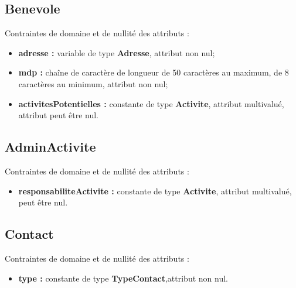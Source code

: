 \documentclass[asi, sansVersion]{picInsa}
\begin{document}
\subsection*{Benevole}
Contraintes de domaine et de nullité des attributs :
\begin{itemize}
 	\item \textbf{adresse :} variable de type \textbf{Adresse}, attribut non nul;
	\item \textbf{mdp :} chaîne de caractère de longueur de 50 caractères au maximum, de 8 caractères au minimum, attribut non nul;  
	\item \textbf{activitesPotentielles :} constante de type \textbf{Activite}, attribut multivalué, attribut  peut être nul.\\
\end{itemize}  

\subsection*{AdminActivite}
Contraintes de domaine et de nullité des attributs :
\begin{itemize}
\item \textbf{responsabiliteActivite :} constante de type \textbf{Activite}, attribut multivalué, peut être nul.\\
\end{itemize}

 
\subsection*{Contact}
Contraintes de domaine et de nullité des attributs :
 \begin{itemize}
 \item \textbf{type :} constante de type \textbf{TypeContact},attribut non nul.\\
 \end{itemize}
\end{document}
